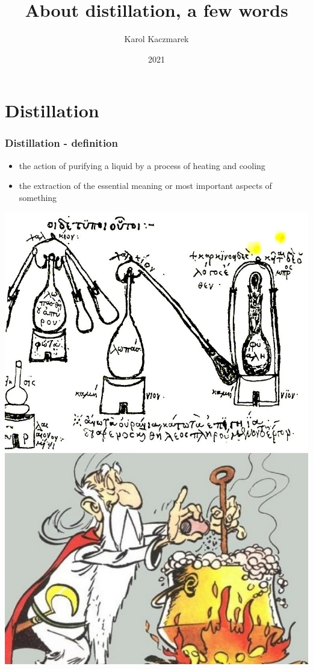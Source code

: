 \documentclass{beamer}
\title{About distillation, a few words}
\date{2021}
\author{Karol Kaczmarek}
\begin{document}
\begin{frame}
    \titlepage
\end{frame}

\section{Distillation}
\begin{frame}
    \frametitle{Distillation - definition}
    \begin{itemize}
        \item the action of purifying a liquid by a process of heating and cooling
        \item the extraction of the essential meaning or most important aspects of something
    \end{itemize}
    \begin{center}
        \includegraphics[scale=0.20]{img/zosimos_distillation_equipment.jpg}
        \includegraphics[scale=0.25]{img/kociolek_panoramixa.jpg}
    \end{center}
\end{frame}
\end{document}
